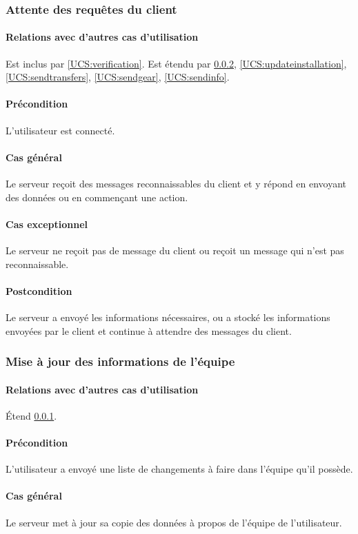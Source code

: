 \subsubsection{Attente des requêtes du client}
	\label{UCS:waitrequest}
	\paragraph{Relations avec d'autres cas d'utilisation} Est inclus par \ref{UCS:verification}.
	Est étendu par \ref{UCS:updatesquad}, \ref{UCS:updateinstallation}, \ref{UCS:sendtransfers}, \ref{UCS:sendgear}, \ref{UCS:sendinfo}.
	\paragraph{Précondition} L'utilisateur est connecté.
    \paragraph{Cas général} Le \gls{serveur} reçoit des messages reconnaissables du \gls{client} et y répond en envoyant des données ou en commençant une action.
    \paragraph{Cas exceptionnel} Le serveur ne reçoit pas de message du client ou reçoit un message qui n'est pas reconnaissable.
    \paragraph{Postcondition} Le serveur a envoyé les informations nécessaires, ou a stocké les informations envoyées par le client et continue à attendre des messages du client.

\subsubsection{Mise à jour des informations de l'équipe}
	\label{UCS:updatesquad}
	\paragraph{Relations avec d'autres cas d'utilisation} \'Etend \ref{UCS:waitrequest}.
	\paragraph{Précondition} L'utilisateur a envoyé une liste de changements à faire dans l'équipe qu'il possède.
    \paragraph{Cas général} Le \gls{serveur} met à jour sa copie des données à propos de l'équipe de l'utilisateur.
